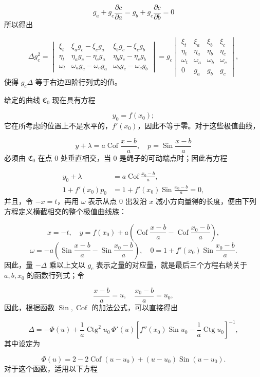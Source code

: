 \documentclass[11pt,a4paper,leqno]{article}
\newcommand{\Cof}{\operatorname{Cof}}
\newcommand{\Sin}{\operatorname{Sin}}
\newcommand{\Ctg}{\operatorname{Ctg}}
\begin{document}
\[
g_a+g_c\frac{\partial c}{\partial a}=g_b+g_c\frac{\partial c}{\partial b}=0
\]
所以得出

\[
\Delta g_c^2=\begin{vmatrix}
\xi_t&\xi_ag_c-\xi_cg_a&\xi_bg_c-\xi_cg_b\\
\eta_t&\eta_ag_c-\eta_cg_a&\eta_bg_c-\eta_cg_b\\
\omega_t&\omega_ag_c-\omega_cg_a&\omega_bg_c-\omega_cg_b
\end{vmatrix}
=g_c\begin{vmatrix}
\xi_t&\xi_a&\xi_b&\xi_c\\
\eta_t&\eta_a&\eta_b&\eta_c\\
\omega_t&\omega_a&\omega_b&\omega_c\\
0&g_a&g_b&g_c
\end{vmatrix},
\]
\endgroup
使得 $g_c\Delta$ 等于右边四阶行列式的值。

给定的曲线 $\mathfrak{C}_0$ 现在具有方程

\[
y_0=f(x_0);
\]
它在所考虑的位置上不是水平的，$f'(x_0)$，因此不等于零。对于这些极值曲线，

\[
y+\lambda=a\Cof\frac{x-b}{a},\quad p=\Sin\frac{x-b}{a}
\]
必须由 $\mathfrak{C}_0$ 在点 0 处垂直相交，当 0 是绳子的可动端点时；因此有方程

\begin{equation}\tag{31}
\begin{aligned}
y_0+\lambda&=a\Cof\frac{x_0-b}{a},\\
1+f'(x_0)p_0&=1+f'(x_0)\Sin\frac{x_0-b}{a}=0,
\end{aligned}
\end{equation}
并且，令 $-x=t$，再用 $\omega$ 表示从点 0 出发沿 $x$ 减小方向量得的长度，便由下列方程定义横截相交的整个极值曲线族：

\[
x=-t,\quad y=f(x_0)+a\left(\Cof\frac{x-b}{a}-\Cof\frac{x_0-b}{a}\right),
\]
\[
\omega=-a\left(\Sin\frac{x-b}{a}-\Sin\frac{x_0-b}{a}\right),\quad
0=1+f'(x_0)\Sin\frac{x_0-b}{a}.
\]
因此，量 $-\Delta$ 乘以上文以 $g_c$ 表示之量的对应量，就是最后三个方程右端关于 $a,b,x_0$ 的函数行列式；令

\[
\frac{x-b}{a}=u,
\quad
\frac{x_0-b}{a}=u_0,
\]
因此，根据函数 $\Sin,\Cof$ 的加法公式，可以直接得出

\[
\Delta=-\Phi(u)+\frac{1}{a}\Ctg^2u_0\,\Phi'(u)\left[f''(x_0)\Sin u_0-\frac{1}{a}\Ctg u_0\right]^{-1},
\]
其中设定为

\[
\Phi(u)=2-2\Cof(u-u_0)+(u-u_0)\Sin(u-u_0).
\]
对于这个函数，适用以下方程
\end{document}
